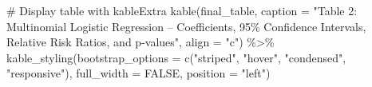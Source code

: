 \documentclass[
  letterpaper,
  DIV=11,
  numbers=noendperiod]{scrartcl}
\newenvironment{Shaded}{\begin{snugshade}}{\end{snugshade}}
\newcommand{\AttributeTok}[1]{\textcolor[rgb]{0.40,0.45,0.13}{#1}}
\newcommand{\CommentTok}[1]{\textcolor[rgb]{0.37,0.37,0.37}{#1}}
\newcommand{\ConstantTok}[1]{\textcolor[rgb]{0.56,0.35,0.01}{#1}}
\newcommand{\FunctionTok}[1]{\textcolor[rgb]{0.28,0.35,0.67}{#1}}
\newcommand{\NormalTok}[1]{\textcolor[rgb]{0.00,0.23,0.31}{#1}}
\newcommand{\SpecialCharTok}[1]{\textcolor[rgb]{0.37,0.37,0.37}{#1}}
\newcommand{\StringTok}[1]{\textcolor[rgb]{0.13,0.47,0.30}{#1}}
\begin{document}
\begin{Shaded}
\begin{Highlighting}[]
\CommentTok{\#  Display table with kableExtra}
\FunctionTok{kable}\NormalTok{(final\_table,}
      \AttributeTok{caption =} \StringTok{"Table 2: Multinomial Logistic Regression – Coefficients, 95\% Confidence Intervals, Relative Risk Ratios, and p{-}values"}\NormalTok{,}
      \AttributeTok{align =} \StringTok{"c"}\NormalTok{) }\SpecialCharTok{\%\textgreater{}\%}
  \FunctionTok{kable\_styling}\NormalTok{(}\AttributeTok{bootstrap\_options =} \FunctionTok{c}\NormalTok{(}\StringTok{"striped"}\NormalTok{, }\StringTok{"hover"}\NormalTok{, }\StringTok{"condensed"}\NormalTok{, }\StringTok{"responsive"}\NormalTok{),}
                \AttributeTok{full\_width =} \ConstantTok{FALSE}\NormalTok{,}
                \AttributeTok{position =} \StringTok{"left"}\NormalTok{)}
\end{Highlighting}
\end{Shaded}
\end{document}
